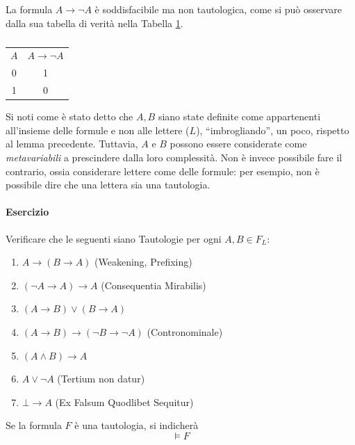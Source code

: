 La formula $A \rightarrow \neg A$ è soddisfacibile ma non tautologica, 
come si può osservare dalla sua tabella di verità nella Tabella \ref{table:sodd}.
\begin{table}[h]
  \centering
  \begin{tabular}{|c|c|}
    \hline 
    $A$ & $A \rightarrow \neg A$\\
     0 &   1 \\
     1 &  0 \\
     \hline
  \end{tabular}
  \caption{}
  \label{table:sodd}
\end{table}

Si noti come è stato detto che $A,B$ siano state definite come appartenenti 
all'insieme delle formule e non alle lettere ($L$), ``imbrogliando'', un poco, 
rispetto al lemma precedente. Tuttavia, $A$ e $B$ possono essere considerate 
come \textit{metavariabili} a prescindere dalla loro complessità. Non è invece 
possibile fare il contrario, ossia considerare lettere come delle formule: 
per esempio, non è possibile dire che una lettera sia una tautologia. 

\paragraph{Esercizio}
Verificare che le seguenti siano Tautologie per ogni $A,B \in F_L$:
\begin{enumerate}
  \item $A \rightarrow (B \rightarrow A)$ (Weakening, Prefixing)
  \item $(\neg A \rightarrow A) \rightarrow A$ (Consequentia Mirabilis)
  \item $(A \rightarrow B) \lor (B \rightarrow A)$ 
  \item $(A \rightarrow B) \rightarrow (\neg B \rightarrow \neg A)$ (Contronominale)
  \item $(A \land B) \rightarrow A$
  \item $A \lor \neg A$  (Tertium non datur)
  \item $\bot \rightarrow A$ (Ex Falsum Quodlibet Sequitur)
\end{enumerate}

\begin{defi}[Tautologia]
Se la formula $F$ è una tautologia, si indicherà 
$$
\models F
$$
\end{defi}


